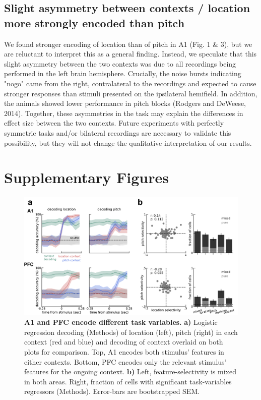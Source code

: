 \documentclass[12pt]{article}
\begin{document}
\subsection*{Slight asymmetry between contexts / location more strongly encoded than pitch}
We found stronger encoding of location than of pitch in A1 (Fig. 1 \& 3), but we are reluctant to interpret this as a general finding. Instead, we speculate that this slight asymmetry between the two contexts was due to all recordings being performed in the left brain hemisphere. Crucially, the noise bursts indicating "nogo" came from the right, contralateral to the recordings and expected to cause stronger responses than stimuli presented on the ipsilateral hemifield. In addition, the animals showed lower performance in pitch blocks (Rodgers and DeWeese, 2014). Together, these asymmetries in the task may explain the differences in effect size between the two contexts. Future experiments with perfectly symmetric tasks and/or bilateral recordings are necessary to validate this possibility, but they will not change the qualitative interpretation of our results. 


\section*{Supplementary Figures}

\begin{figure}
\centering
        \includegraphics[width=\textwidth]{figures/FigS1.pdf}
    \caption{\textbf{A1 and PFC encode different task variables.} \textbf{a)} Logistic regression decoding (Methods) of location (left), pitch (right) in each context (red and blue) and decoding of context overlaid on both plots for comparison. Top, A1 encodes both stimulus’ features in either contexts. Bottom, PFC encodes only the relevant stimulus’ features for the ongoing context. \textbf{b)} Left, feature-selectivity is mixed in both areas. Right, fraction of cells with significant task-variables regressors (Methods). Error-bars are bootstrapped SEM.} 
    \label{figS1}
\end{figure}
\end{document}
